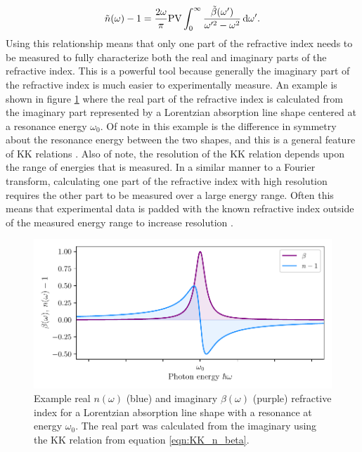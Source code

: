 \begin{equation}
	\label{eqn:KK_n_beta}
	\tilde{n}(\omega) - 1 = \frac{2\omega}{\pi}\mathrm{PV}\int_{0}^{\infty} \frac{\tilde{\beta}(\omega')}{\omega'^2 - \omega^2} \mathop{}\!\mathrm{d} \omega'.
\end{equation}
Using this relationship means that only one part of the refractive index needs to be measured to fully characterize both the real and imaginary parts of the refractive index.  This is a powerful tool because generally the imaginary part of the refractive index is much easier to experimentally measure.  An example is shown in figure \ref{fig:KK_example} where the real part of the refractive index is calculated from the imaginary part represented by a Lorentzian absorption line shape centered at a resonance energy $\omega_0$.  Of note in this example is the difference in symmetry about the resonance energy between the two shapes, and this is a general feature of KK relations \cite{lucariniKramersKronigRelationsOptical2005}.  Also of note, the resolution of the KK relation depends upon the range of energies that is measured.  In a similar manner to a Fourier transform, calculating one part of the refractive index with high resolution requires the other part to be measured over a large energy range.  Often this means that experimental data is padded with the known refractive index outside of the measured energy range to increase resolution \cite{kaplanRetrievalComplexvaluedRefractive2019}.

\begin{figure}
	\centering
	\includegraphics[width=1.0\textwidth]{figures/CATS/KK_example.pdf}
	\caption[Example real and imaginary refractive index calculated using KK relations]{Example real $n(\omega)$ (blue) and imaginary $\beta(\omega)$ (purple) refractive index for a Lorentzian absorption line shape with a resonance at energy $\omega_0$.  The real part was calculated from the imaginary using the KK relation from equation \ref{eqn:KK_n_beta}.}
	\label{fig:KK_example}
\end{figure}



